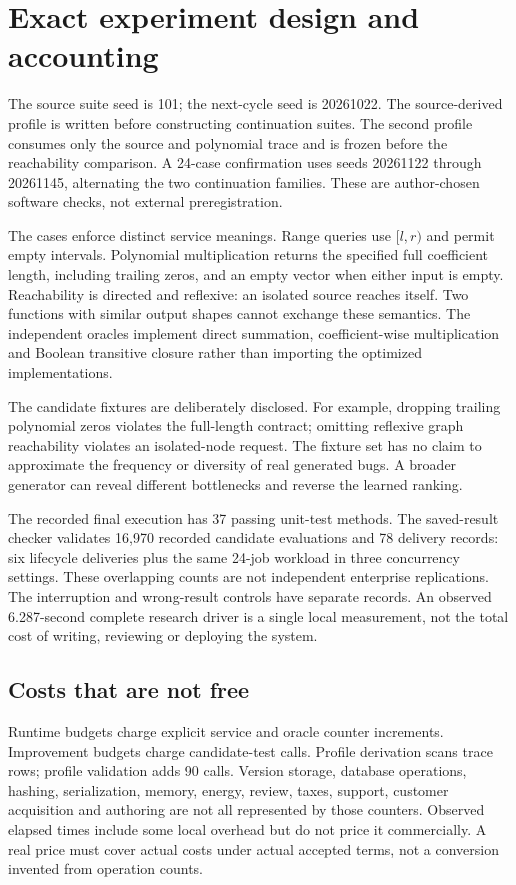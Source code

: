 \documentclass[11pt,letterpaper]{article}
\begin{document}
\section{Exact experiment design and accounting}
The source suite seed is 101; the next-cycle seed is 20261022. The source-derived profile is written before constructing continuation suites. The second profile consumes only the source and polynomial trace and is frozen before the reachability comparison. A 24-case confirmation uses seeds 20261122 through 20261145, alternating the two continuation families. These are author-chosen software checks, not external preregistration.

The cases enforce distinct service meanings. Range queries use $[l,r)$ and permit empty intervals. Polynomial multiplication returns the specified full coefficient length, including trailing zeros, and an empty vector when either input is empty. Reachability is directed and reflexive: an isolated source reaches itself. Two functions with similar output shapes cannot exchange these semantics. The independent oracles implement direct summation, coefficient-wise multiplication and Boolean transitive closure rather than importing the optimized implementations.

The candidate fixtures are deliberately disclosed. For example, dropping trailing polynomial zeros violates the full-length contract; omitting reflexive graph reachability violates an isolated-node request. The fixture set has no claim to approximate the frequency or diversity of real generated bugs. A broader generator can reveal different bottlenecks and reverse the learned ranking.

The recorded final execution has 37 passing unit-test methods. The saved-result checker validates 16,970 recorded candidate evaluations and 78 delivery records: six lifecycle deliveries plus the same 24-job workload in three concurrency settings. These overlapping counts are not independent enterprise replications. The interruption and wrong-result controls have separate records. An observed 6.287-second complete research driver is a single local measurement, not the total cost of writing, reviewing or deploying the system.

\subsection{Costs that are not free}
Runtime budgets charge explicit service and oracle counter increments. Improvement budgets charge candidate-test calls. Profile derivation scans trace rows; profile validation adds 90 calls. Version storage, database operations, hashing, serialization, memory, energy, review, taxes, support, customer acquisition and authoring are not all represented by those counters. Observed elapsed times include some local overhead but do not price it commercially. A real price must cover actual costs under actual accepted terms, not a conversion invented from operation counts.
\end{document}
